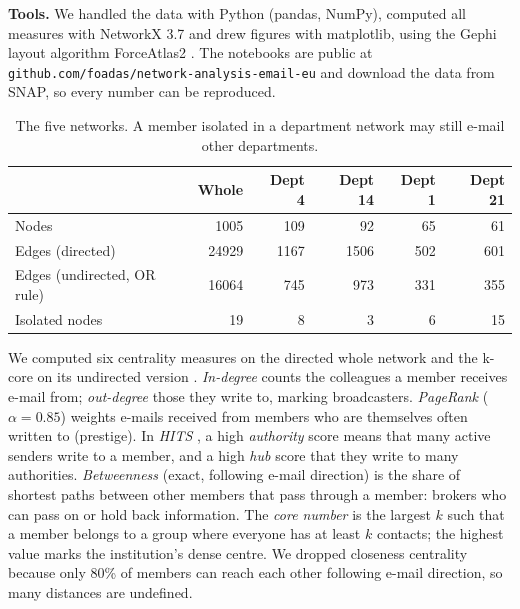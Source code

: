 \textbf{Tools.} We handled the data with Python (pandas, NumPy), computed all
measures with NetworkX 3.7 and drew figures with matplotlib, using the Gephi
layout algorithm ForceAtlas2 \cite{jacomy2014}. The notebooks are public at
\texttt{github.com/foadas/network-analysis-email-eu} and download the data
from SNAP, so every number can be reproduced.

\begin{table}[ht]
\centering
\small
\begin{tabular}{lrrrrr}
\toprule
 & Whole & Dept 4 & Dept 14 & Dept 1 & Dept 21 \\
\midrule
Nodes                        & 1005  & 109  & 92   & 65   & 61   \\
Edges (directed)             & 24929 & 1167 & 1506 & 502  & 601  \\
Edges (undirected, OR rule)  & 16064 & 745  & 973  & 331  & 355  \\
Isolated nodes               & 19    & 8    & 3    & 6    & 15   \\
\bottomrule
\end{tabular}
\caption{The five networks. A member isolated in a department network may
still e-mail other departments.}
\label{tab:datasets}
\end{table}


We computed six centrality measures on the directed whole network and the
k-core on its undirected version \cite{newman2018,borgatti2018}.
\emph{In-degree} counts the colleagues a member receives e-mail from;
\emph{out-degree} those they write to, marking broadcasters.
\emph{PageRank} \cite{brin1998} ($\alpha=0.85$) weights e-mails received
from members who are themselves often written to (prestige). In \emph{HITS}
\cite{kleinberg1999}, a high \emph{authority} score means that many active
senders write to a member, and a high \emph{hub} score that they write to
many authorities. \emph{Betweenness} \cite{freeman1977} (exact, following
e-mail direction) is the share of shortest paths between other members that
pass through a member: brokers who can pass on or hold back information. The
\emph{core number} is the largest $k$ such that a member belongs to a group
where everyone has at least $k$ contacts; the highest value marks the
institution's dense centre. We dropped closeness centrality because only 80\%
of members can reach each other following e-mail direction, so many distances
are undefined.

